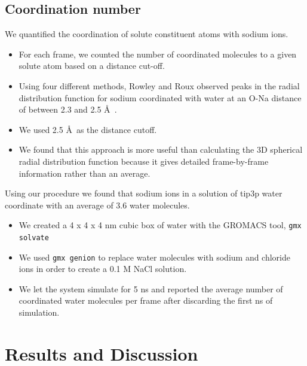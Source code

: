 \documentclass{article}
\begin{document}
  \subsection*{Coordination number}\label{method:coordination}

  We quantified the coordination of solute constituent atoms with sodium ions.
  \begin{itemize}
  	\item For each frame, we counted the number of coordinated molecules to a
  	given solute atom based on a distance cut-off. 
  	\item Using four different methods, Rowley and Roux observed peaks in the
  	radial distribution function for sodium coordinated with water at an O-Na
  	distance of between 2.3 and 2.5 \AA~\cite{rowley_solvation_2012}. 
  	\item We used 2.5 \AA~as the distance cutoff.
  	\item We found that this approach is more useful than calculating the
	3D spherical radial distribution function because it gives detailed
	frame-by-frame information rather than an average. 
  \end{itemize}
  
  Using our procedure we found that sodium ions in a solution of tip3p water
  coordinate with an average of 3.6 water molecules.
  \begin{itemize}
    \item We created a 4 x 4 x 4 nm cubic box of water with the GROMACS tool,
    \texttt{gmx solvate}
    \item We used \texttt{gmx genion} to replace water molecules with sodium
    and chloride ions in order to create a 0.1 M NaCl solution.
    \item We let the system simulate for 5 ns and reported the average
    number of coordinated water molecules per frame after discarding the first ns of 
    simulation. %
  \end{itemize}
   
  \section{Results and Discussion}
  
\end{document}
